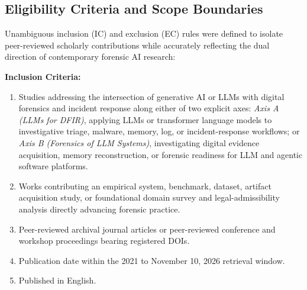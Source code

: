 \subsection{Eligibility Criteria and Scope Boundaries}
Unambiguous inclusion (IC) and exclusion (EC) rules were defined to isolate peer-reviewed scholarly contributions while accurately reflecting the dual direction of contemporary forensic AI research:

\textbf{Inclusion Criteria:}
\begin{enumerate}
    \item[\textbf{IC1:}] Studies addressing the intersection of generative AI or LLMs with digital forensics and incident response along either of two explicit axes: \textit{Axis A (LLMs for DFIR)}, applying LLMs or transformer language models to investigative triage, malware, memory, log, or incident-response workflows; or \textit{Axis B (Forensics of LLM Systems)}, investigating digital evidence acquisition, memory reconstruction, or forensic readiness for LLM and agentic software platforms.
    \item[\textbf{IC2:}] Works contributing an empirical system, benchmark, dataset, artifact acquisition study, or foundational domain survey and legal-admissibility analysis directly advancing forensic practice.
    \item[\textbf{IC3:}] Peer-reviewed archival journal articles or peer-reviewed conference and workshop proceedings bearing registered DOIs.
    \item[\textbf{IC4:}] Publication date within the 2021 to November 10, 2026 retrieval window.
    \item[\textbf{IC5:}] Published in English.
\end{enumerate}

